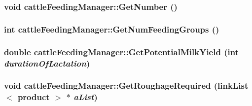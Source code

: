 \label{classcattle_feeding_manager_aae27bce98c713f0c2ee71f49d824f967}
\hypertarget{classcattle_feeding_manager_a738461cf54320bcc6d6522c8e5c85494}{
\subsubsection[{GetNumber}]{\setlength{\rightskip}{0pt plus 5cm}void cattleFeedingManager::GetNumber ()}}
\label{classcattle_feeding_manager_a738461cf54320bcc6d6522c8e5c85494}
\hypertarget{classcattle_feeding_manager_a625686a337bc7f33fcc6e71cc426da61}{
\subsubsection[{GetNumFeedingGroups}]{\setlength{\rightskip}{0pt plus 5cm}int cattleFeedingManager::GetNumFeedingGroups ()}}
\label{classcattle_feeding_manager_a625686a337bc7f33fcc6e71cc426da61}
\hypertarget{classcattle_feeding_manager_a27d81fb8607d248d56e5fff6dd39b4c0}{
\subsubsection[{GetPotentialMilkYield}]{\setlength{\rightskip}{0pt plus 5cm}double cattleFeedingManager::GetPotentialMilkYield (int {\em durationOfLactation})}}
\label{classcattle_feeding_manager_a27d81fb8607d248d56e5fff6dd39b4c0}
\hypertarget{classcattle_feeding_manager_a67a9e9ba669dc913bd9f209a377c39c1}{
\subsubsection[{GetRoughageRequired}]{\setlength{\rightskip}{0pt plus 5cm}void cattleFeedingManager::GetRoughageRequired ({\bf linkList}$<$ {\bf product} $>$ $\ast$ {\em aList})}}
